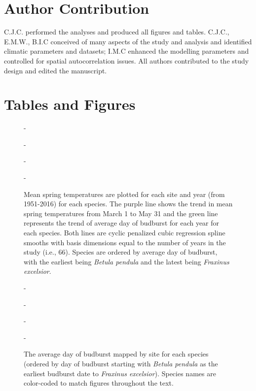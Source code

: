 \documentclass{article}\usepackage[]{graphicx}\usepackage[]{color}
\begin{document}
\section*{Author Contribution}
C.J.C. performed the analyses and produced all figures and tables. C.J.C., E.M.W., B.I.C conceived of many aspects of the study and analysis and identified climatic parameters and datasets; I.M.C enhanced the modelling parameters and controlled for spatial autocorrelation issues. All authors contributed to the study design and edited the manuscript.



\section*{Tables and Figures} 

{\begin{figure} [H]
  -\begin{center}
  -\caption{Mean spring temperatures are plotted for each site and year (from 1951-2016) for each species. The purple line shows the trend in mean spring temperatures from March 1 to May 31 and the green line represents the trend of average day of budburst for each year for each species. Both lines are cyclic penalized cubic regression spline smooths with basis dimensions equal to the number of years in the study (i.e., 66). Species are ordered by average day of budburst, with the earliest being \textit{Betula pendula} and the latest being \textit{Fraxinus excelsior}. }\label{fig:mst}
  -\end{center}
  -\end{figure}}

{\begin{figure} [H]
  -\begin{center}
  -\caption{The average day of budburst mapped by site for each species (ordered by day of budburst starting with \textit{Betula pendula} as the earliest budburst date to \textit{Fraxinus excelsior}). Species names are color-coded to match figures throughout the text. }\label{fig:bbmap}
  -\end{center}
  -\end{figure}}
  
\end{document}

